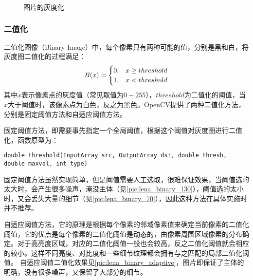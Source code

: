 \begin{figure}[htbp]
  \centering
  \caption{图片的灰度化}
	\hfill
  \label{pic:greyscale}
\end{figure}

\subsubsection*{二值化}
\label{sub:二值化}
二值化图像（Binary Image）中，每个像素只有两种可能的值，分别是黑和白，将灰度图二值化的过程满足\label{pic:binarization}：
\begin{equation} \label{pic:binarization}
	B(x)=
	\begin{cases}
		0,&x\geq threshold\cr 1,&x<threshold
	\end{cases}
\end{equation}
其中$x$表示像素点的灰度值（常见取值为$0-255$），$threshold$为二值化的阈值，当$x$大于阈值时，该像素点为白色，反之为黑色。OpenCV提供了两种二值化方法，分别是固定阈值方法和自适应阈值方法。

固定阈值方法，即需要事先指定一个全局阈值，根据这个阈值对灰度图进行二值化，函数原型为：
\begin{lstlisting}
double threshold(InputArray src, OutputArray dst, double thresh, double maxval, int type)
\end{lstlisting}
固定阈值方法虽然实现简单，但是阈值需要人工选取，很难保证效果，当阈值选的太大时，会产生很多噪声，淹没主体（见\autoref{pic:lena_binary_130}），阈值选的太小时，又会丢失大量的细节（见\autoref{pic:lena_binary_70}），因此这种方法在具体实施时并不推荐。

自适应阈值方法，它的原理是根据每个像素的邻域像素值来确定当前像素的二值化阈值，它的优点是每个像素的二值化阈值是动态的，由像素周围区域像素的分布确定。对于高亮度区域，对应的二值化阈值一般也会较高，反之二值化阈值就会相应的较小。这样不同亮度、对比度和一些细节纹理都会拥有与之匹配的局部二值化阈值\citep{binarization}。
自适应阈值二值化效果见\autoref{pic:lena_binary_adaptive}，图片即保证了主体的明确，没有很多噪声，又保留了大部分的细节。

